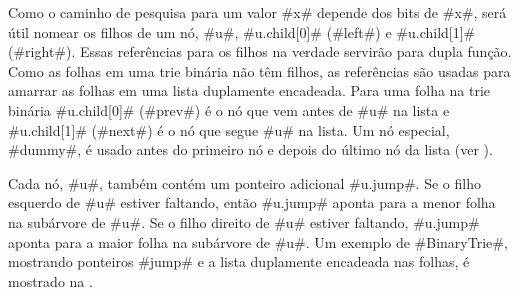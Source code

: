 Como o caminho de pesquisa 
% 
para um valor #x# depende dos bits de #x#, será útil nomear os filhos de um nó, #u#, #u.child[0]# (#left#) e #u.child[1]# (#right#). Essas referências para os filhos na verdade servirão para dupla função. Como as folhas em uma trie binária não têm filhos, as referências são usadas para amarrar as folhas em uma lista duplamente encadeada.
Para uma folha na trie binária #u.child[0]# (#prev#) é o nó que vem antes de #u# na lista e #u.child[1]# (#next#) é o nó que segue #u# na lista. Um nó especial, #dummy#, é usado antes do primeiro nó e depois do último nó da lista (ver ).

Cada nó, #u#, também contém um ponteiro adicional #u.jump#. Se o filho esquerdo de #u# estiver faltando, então #u.jump# aponta para a menor folha na subárvore de #u#. Se o filho direito de #u# estiver faltando, #u.jump# aponta para a maior folha na subárvore de #u#. Um exemplo de #BinaryTrie#, mostrando ponteiros #jump#  e a lista duplamente encadeada nas folhas, é mostrado na .

